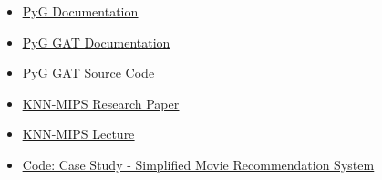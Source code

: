 \documentclass{beamer}
\begin{document}


\begin{frame}[fragile]
\begin{itemize}
\frametitle{References}
[ball]

\item \href{https://pytorch-geometric.readthedocs.io/en/latest/}{\underline{PyG Documentation}}

\vspace{0.5cm}

\item \href{https://pytorch-geometric.readthedocs.io/en/latest/generated/torch_geometric.nn.conv.GATConv.html#torch_geometric.nn.conv.GATConv}{\underline{PyG GAT Documentation}}

\vspace{0.5cm}

\item \href{https://pytorch-geometric.readthedocs.io/en/latest/_modules/torch_geometric/nn/conv/gat_conv.html#GATConv}{\underline{PyG GAT Source Code}}

\vspace{0.5cm}

\item \href{https://www.ijcai.org/Proceedings/11/Papers/222.pdf}{\underline{KNN-MIPS Research Paper}}

\vspace{0.5cm}

\item \href{https://www.cse.cuhk.edu.hk/systems/hash/gqr/report/bob-slide.pdf}{\underline{KNN-MIPS Lecture}}

\vspace{0.5cm}

\item \href{https://github.com/twallett/GNN/blob/main/code/main.py}{\underline{Code: Case Study - Simplified Movie Recommendation System}}

\end{itemize}
\end{frame}

\end{document}
